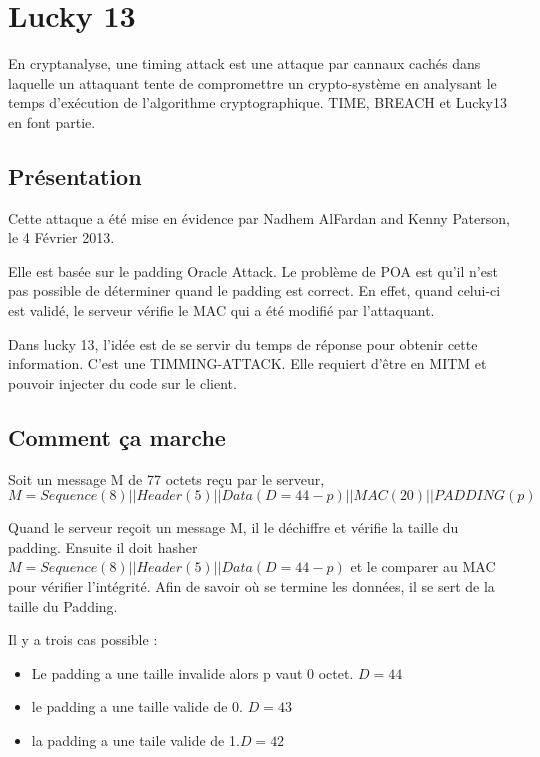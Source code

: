 \chapter{Lucky 13}
\label{chapter:luck}

En cryptanalyse, une timing attack est une attaque par cannaux cachés dans laquelle 
un attaquant tente de compromettre un crypto-système en analysant le temps d'exécution 
de l'algorithme cryptographique. TIME, BREACH  et Lucky13 en font partie.

\section{Présentation}
\label{sec:pL13}

Cette attaque a été mise en évidence par Nadhem AlFardan and Kenny Paterson, le 4 Février 2013.

Elle est basée sur le padding Oracle Attack\up{\ref{chapter:poa}}. Le problème de POA est qu'il n'est pas possible de déterminer
quand le padding est correct. En effet, quand celui-ci est validé, le serveur vérifie le MAC qui a été modifié par l'attaquant.

Dans lucky 13, l'idée est de se servir du temps de réponse pour obtenir cette information. C'est une TIMMING-ATTACK.
Elle requiert d'être en MITM et pouvoir injecter du code sur le client.

\section{Comment ça marche}
\label{sec:ccmL13}

Soit un message M de 77 octets reçu par le serveur, \[ M = Sequence (8) || Header (5) || Data (D = 44 -p) || MAC (20) || PADDING (p) \]

Quand le serveur reçoit un message M, il le déchiffre et vérifie la taille du padding. 
Ensuite il doit hasher  $M = Sequence (8) || Header (5) || Data (D = 44 - p)$  et le comparer au MAC 
pour vérifier l'intégrité. Afin de savoir où se termine les données, il se sert de la taille du Padding.

Il y a trois cas possible : 
\begin{itemize}
\item Le padding a une taille invalide alors p vaut 0 octet. $D=44$
\item le padding a une taille valide de 0. $D=43$ 
\item la padding a une taile valide de 1.$D=42$
\end{itemize}

